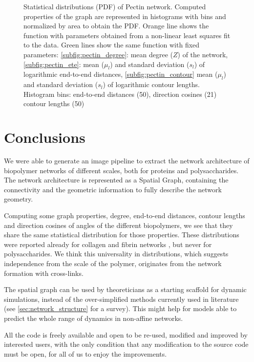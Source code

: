 \begin{figure}[H]
\begin{subfigure}{0.5\textwidth}
  \end{subfigure}
  \caption{Statistical distributions (PDF) of Pectin network. Computed properties of the graph are represented in histograms with bins and normalized by area to obtain the PDF. Orange line shows the function with parameters obtained from a non-linear least squares fit to the data.
    Green lines show the same function with fixed parameters: \ref{subfig:pectin_degree}: mean degree ($Z$) of the network, \ref{subfig:pectin_ete}: mean ($\mu_l$) and standard deviation ($s_l$) of logarithmic end-to-end distances,
  \ref{subfig:pectin_contour} mean ($\mu_l$) and standard deviation ($s_l$) of logarithmic contour lengths.
Histogram bins: end-to-end distances (50), direction cosines (21) contour lengths (50) }
  \label{fig:pectin_thin}
\end{figure}

\section{Conclusions}%
\label{sec:conclusions_image}

We were able to generate an image pipeline to extract the network architecture
of biopolymer networks of different scales, both for proteins and polysaccharides.
The network architecture is represented as a \gls{Spatial Graph}, containing the connectivity and
the geometric information to fully describe the network geometry.

Computing some graph properties, degree, end-to-end distances, contour lengths and direction cosines of angles of the different biopolymers, we see that they share the same statistical distribution for those properties. These distributions were reported already for collagen and fibrin networks \cite{lindstrom_finite-strain_2013}, but never for polysaccharides. We think this universality in distributions, which suggests independence from the scale of the polymer, originates from the network formation with cross-links.

The spatial graph can be used by theoreticians as a starting scaffold for dynamic simulations, instead of the over-simplified methods currently used in literature (see \autoref{sec:network_structure} for a survey). This might help for models able to predict the whole range of dynamics in non-affine networks.%

All the code is freely available and open to be re-used, modified and improved by interested users, with the only condition that any modification to the source code must be open, for all of us to enjoy the improvements.


